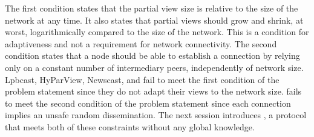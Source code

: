 The first condition states that the partial view size is relative to the size of
the network at any time. It also states that partial views should grow and
shrink, at worst, logarithmically compared to the size of the network. This is a
condition for adaptiveness and not a requirement for network connectivity. The
second condition states that a node should be able to establish a connection by
relying only on a constant number of intermediary peers, independently of
network size.
Lpbcast, HyParView, Newscast, and \CYCLON fail to meet the first
condition of the problem statement since they do not adapt their views
to the network size. \SCAMP fails to meet the second condition of the
problem statement since each connection implies an unsafe random
dissemination. The next session introduces \SPRAY, a protocol that
meets both of these constraints without any global knowledge.


